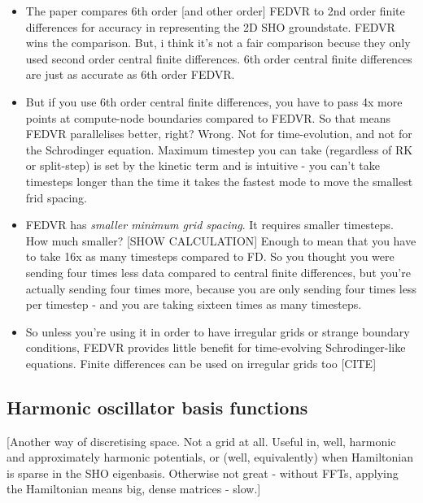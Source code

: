\begin{itemize}
    \item The paper compares 6th order [and other order] FEDVR to 2nd order finite differences for accuracy in representing the 2D SHO groundstate. FEDVR wins the comparison. But, i think it's not a fair comparison becuse they only used second order central finite differences. 6th order central finite differences are just as accurate as 6th order FEDVR.
    \item But if you use 6th order central finite differences, you have to pass 4x more points at compute-node boundaries compared to FEDVR. So that means FEDVR parallelises better, right? Wrong. Not for time-evolution, and not for the Schrodinger equation. Maximum timestep you can take (regardless of RK or split-step) is set by the kinetic term and is intuitive - you can't take timesteps longer than the time it takes the fastest mode to move the smallest frid spacing.
    \item FEDVR has \emph{smaller minimum grid spacing}. It requires smaller timesteps. How much smaller? [SHOW CALCULATION] Enough to mean that you have to take 16x as many timesteps compared to FD. So you thought you were sending four times less data compared to central finite differences, but you're actually sending four times more, because you are only sending four times less per timestep - and you are taking sixteen times as many timesteps.

    \item So unless you're using it in order to have irregular grids or strange boundary conditions, FEDVR provides little benefit for time-evolving Schrodinger-like equations. Finite differences can be used on irregular grids too [CITE]

\end{itemize}

\subsection{Harmonic oscillator basis functions}

[Another way of discretising space. Not a grid at all. Useful in, well, harmonic and approximately harmonic potentials, or (well, equivalently) when Hamiltonian is sparse in the SHO eigenbasis. Otherwise not great - without FFTs, applying the Hamiltonian means big, dense matrices - slow.]



